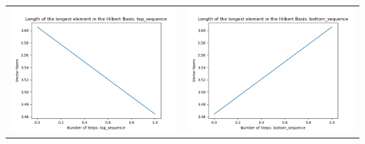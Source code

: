 \documentclass[10pt]{article}
\begin{document}
\begin{tabular}{c|c}
\begin{minipage}{.4\textwidth}
\includegraphics[width=\textwidth]{"DATA/4d/4 generators 2 bound I/top_sequence LENGTH"}
\end{minipage} &
\begin{minipage}{.4\textwidth}
\includegraphics[width=\textwidth]{"DATA/4d/4 generators 2 bound I bottomup/bottom_sequence LENGTH"}
\end{minipage}
\end{tabular}
\end{document}
